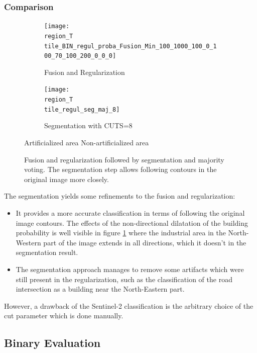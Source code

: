 \documentclass[10pt]{article}
\newcommand{\legendebin}{\vspace{3mm}
    
    \small\centering
    \fcolorbox{black}{red}{\rule{0pt}{6pt}\rule{6pt}{0pt}}\quad Artificialized area 
    \fcolorbox{black}{green}{\rule{0pt}{6pt}\rule{6pt}{0pt}}\quad Non-artificialized area
    }
\newcommand{\tile}{41000_30000}
\newcommand{\region}{finistere}
\begin{document}
\subsubsection{Comparison}
\newcommand{\figureBinRegulSeg}{
\begin{figure}[H]
    \centering
    \begin{subfigure}{0.49\textwidth}
        \centering
        \texttt{[image: \\region\_T\\tile\_BIN\_regul\_proba\_Fusion\_Min\_100\_1000\_100\_0\_100\_70\_100\_200\_0\_0\_0]}
        \caption{Fusion and Regularization}
        \label{subfig:fusionRegComp\tile}
    \end{subfigure}
    \begin{subfigure}{0.49\textwidth}
        \centering
        \texttt{[image: \\region\_T\\tile\_regul\_seg\_maj\_8]}
        \caption{Segmentation with CUTS=8}
    \end{subfigure}
    \legendebin
    \caption{Fusion and regularization followed by segmentation and majority voting. The segmentation step allows following contours in the original image more closely.}
    \label{fig:comparison\tile}
\end{figure}
}
\figureBinRegulSeg
The segmentation yields some refinements to the fusion and regularization:
\begin{itemize}
    \item It provides a more accurate classification in terms of following the original image contours. The effects of the non-directional dilatation of the building probability is well visible in figure \ref{subfig:fusionRegComp\tile} where the industrial area in the North-Western part of the image extends in all directions, which it doesn't in the segmentation result.
    \item The segmentation approach manages to remove some artifacts which were still present in the regularization, such as the classification of the road intersection as a building near the North-Eastern part.
\end{itemize}
However, a drawback of the Sentinel-2 classification is the arbitrary choice of the cut parameter which is done manually.

\subsection{Binary Evaluation}
\end{document}
